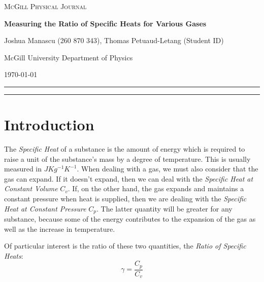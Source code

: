 \documentclass[12pt]{article}
\begin{document}
	
\begin{titlepage} 
\thispagestyle{empty}
	\begin{center}
	
\Huge
\textsc{McGill Physical Journal}
		\vspace*{1.5cm}
		
		\Huge
		\textbf{Measuring the Ratio of Specific Heats for Various Gases}
		\large
		\vspace{1.5cm}
		
		Joshua Manascu (260 870 343), Thomas Petuaud-Letang (Student ID)
		
		McGill University Department of Physics
		
		\today
	\end{center}
		\hrule
	\begin{abstract} %
///
\end{abstract}
\hrule
\end{titlepage}
\setcounter{page}{1}

\section{Introduction}\label{sec:introduction}
The \textit{Specific Heat} of a substance is the amount of energy which is required to raise a unit of the substance's mass by a degree of temperature. This is usually measured in $J Kg^{-1} K^{-1}$.
When dealing with a gas, we must also consider that the gas can expand. If it doesn't expand, then we can deal with the \textit{Specific Heat at Constant Volume} $C_v$. If, on the other hand, the gas expands and maintains a constant pressure when heat is supplied, then we are dealing with the \textit{Specific Heat at Constant Pressure} $C_p$. The latter quantity will be greater for any substance, because some of the energy contributes to the expansion of the gas as well as the increase in temperature.

Of particular interest is the ratio of these two quantities, the \textit{Ratio of Specific Heats}:
\begin{equation}\label{eq:gamma}
	\gamma = \frac{C_p}{C_v}
\end{equation}
\end{document}
